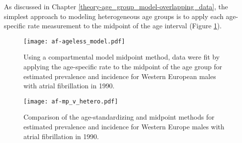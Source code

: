 As discussed in Chapter \ref{theory-age_group_model-overlapping_data}, the simplest approach to modeling heterogeneous age groups is to apply each age-specific rate measurement to the midpoint of the age interval (Figure \ref{fig:app-af mp data}).  

    \begin{figure}[h]
        \begin{center}
            \texttt{[image: af-ageless\_model.pdf]}
            \caption{Using a compartmental model midpoint method, data were fit by applying the age-specific rate to the midpoint of the age group for estimated prevalence and incidence for Western European males with atrial fibrillation in 1990.}
            \label{fig:app-af mp data}
        \end{center}
    \end{figure}

    \begin{figure}[h]
        \begin{center}
            \texttt{[image: af-mp\_v\_hetero.pdf]}
            \caption{Comparison of the age-standardizing and midpoint methods for estimated prevalence and incidence for Western Europe males with atrial fibrillation in 1990.}
            \label{fig:app-af mp}
        \end{center}
    \end{figure}
